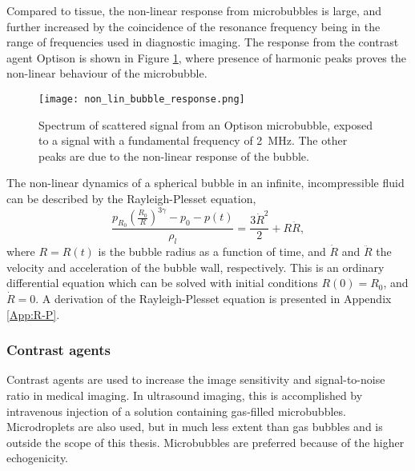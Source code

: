 Compared to tissue, the non-linear response from microbubbles is large, and further increased by the coincidence of the resonance frequency being in the range of frequencies used in diagnostic imaging. The response from the contrast agent Optison\texttrademark{}  is shown in Figure \ref{Fig:bub_response}, where presence of harmonic peaks proves the non-linear behaviour of the microbubble. 

\begin{figure}[h]
  \centering
  \texttt{[image: non\_lin\_bubble\_response.png]}
  \caption{Spectrum of scattered signal from an Optison\texttrademark{} microbubble, exposed to a signal with a fundamental frequency of \SI{2}{\mega\hertz}. The other peaks are due to the non-linear response of the bubble\cite{Shi1999}.}
  \label{Fig:bub_response}
\end{figure}
The non-linear dynamics of a spherical bubble in an infinite, incompressible fluid can be described by the Rayleigh-Plesset equation,
\begin{equation}
\label{r-p}
\frac{p_{R_0}\left(\frac{R_0}{R}\right)^{3\gamma}-p_0 - p(t)}{\rho_l} = \frac{3\dot{R}^2}{2}+R\ddot{R},
\end{equation}
where $R = R(t)$ is the bubble radius as a function of time, and $\dot{R}$ and $\ddot{R}$ the velocity and acceleration of the bubble wall, respectively. This is an ordinary differential equation which can be solved with initial conditions $R(0) = R_0$, and $\dot{R} = 0$\cite{Moss2014}. A derivation of the Rayleigh-Plesset equation is presented in Appendix \ref{App:R-P}.

 
\clearpage
\subsubsection{Contrast agents}
\label{contrast agents}

Contrast agents are used to increase the image sensitivity and signal-to-noise ratio in medical imaging. In ultrasound imaging, this is accomplished by intravenous injection of a solution containing gas-filled microbubbles\cite{Paradossi2010}. Microdroplets are also used\cite{Soman2006}, but in much less extent than gas bubbles and is outside the scope of this thesis. Microbubbles are preferred because of the higher echogenicity\cite{Talu2008}.

